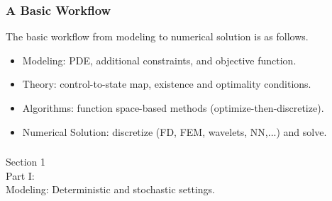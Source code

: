 \documentclass[aspectratio=169,xcolor=dvipsnames,10pt]{beamer}
\begin{document}
\begin{frame}\frametitle{A Basic Workflow}
\begin{exampleblock}{}
The basic workflow from modeling to numerical solution is as follows.
\begin{itemize}
\item Modeling: PDE, additional constraints, and objective function.

\item Theory: control-to-state map, existence and optimality conditions.

\item Algorithms: function space-based methods (optimize-then-discretize).

\item Numerical Solution: discretize (FD, FEM, wavelets, NN,...) and solve.
\end{itemize}
\end{exampleblock}
\end{frame}

\begin{frame}\frametitle{}
\begin{center}\Large
Section 1\\
Part I:\\
Modeling: Deterministic and stochastic settings.
\end{center}
\end{frame}
\end{document}
